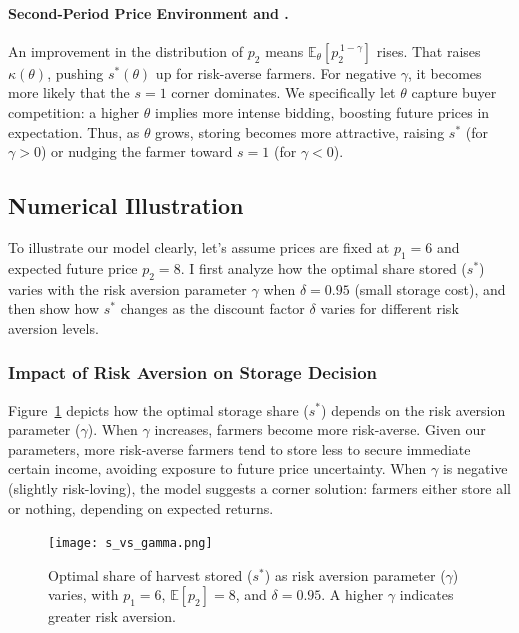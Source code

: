 \documentclass[12pt]{article}
\begin{document}
\paragraph{Second-Period Price Environment and \boldmath{$\theta$}.}
An improvement in the distribution of $p_2$ means $\mathbb{E}_\theta[p_2^{\,1-\gamma}]$ rises. That raises $\kappa(\theta)$, pushing $s^*(\theta)$ up for risk-averse farmers. For negative $\gamma$, it becomes more likely that the $s=1$ corner dominates. We specifically let $\theta$ capture buyer competition: a higher $\theta$ implies more intense bidding, boosting future prices in expectation. Thus, as $\theta$ grows, storing becomes more attractive, raising $s^*$ (for $\gamma>0$) or nudging the farmer toward $s=1$ (for $\gamma<0$).


\subsection{Numerical Illustration}

To illustrate our model clearly, let's assume prices are fixed at $p_1=6$ and expected future price $p_2=8$. I first analyze how the optimal share stored ($s^*$) varies with the risk aversion parameter $\gamma$ when $\delta=0.95$ (small storage cost), and then show how $s^*$ changes as the discount factor $\delta$ varies for different risk aversion levels.

\subsubsection{Impact of Risk Aversion on Storage Decision}

Figure~\ref{fig:gamma} depicts how the optimal storage share ($s^*$) depends on the risk aversion parameter ($\gamma$). When $\gamma$ increases, farmers become more risk-averse. Given our parameters, more risk-averse farmers tend to store less to secure immediate certain income, avoiding exposure to future price uncertainty. When $\gamma$ is negative (slightly risk-loving), the model suggests a corner solution: farmers either store all or nothing, depending on expected returns.

\begin{figure}[H]
    \centering
    \texttt{[image: s\_vs\_gamma.png]}
    \caption{Optimal share of harvest stored ($s^*$) as risk aversion parameter ($\gamma$) varies, with $p_1=6$, $\mathbb{E}[p_2]=8$, and $\delta=0.95$. A higher $\gamma$ indicates greater risk aversion.}
    \label{fig:gamma}
\end{figure}
\end{document}
